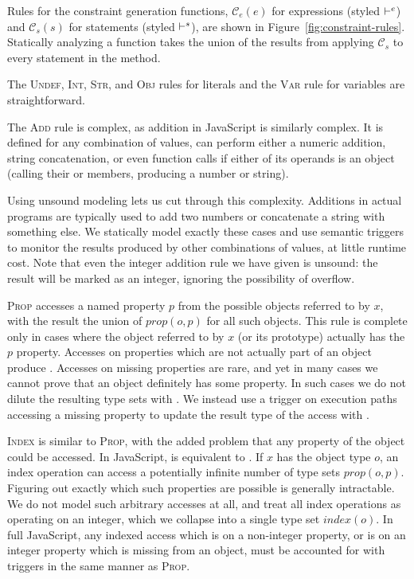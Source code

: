 Rules for the constraint generation functions, $\mathcal{C}_e(e)$ for
expressions (styled $\vdash^e$) and $\mathcal{C}_s(s)$ for statements (styled $\vdash^s$),
are shown in
Figure~\ref{fig:constraint-rules}. Statically analyzing a function takes
the union of the results from applying $\mathcal{C}_s$ to every
statement in the method.

The \textsc{Undef}, \textsc{Int}, \textsc{Str}, and \textsc{Obj}
rules for literals and the \textsc{Var} rule for variables are
straightforward.

The \textsc{Add} rule is complex, as addition in JavaScript is similarly complex. It is
defined for any combination of values, can perform either a numeric addition,
string concatenation, or even function calls if either of its operands is an
object (calling their  or  members, producing a
number or string).

Using unsound modeling lets us cut through this complexity.
Additions in actual programs are typically used to add two numbers
or concatenate a string with something else.
We statically model exactly these cases
and use semantic triggers to monitor the results produced by other
combinations of values, at little runtime cost.
Note that even the integer addition rule we have given is unsound: the
result will be marked as an integer, ignoring the possibility of
overflow.

\textsc{Prop} accesses a named property $p$ from the possible objects referred
to by $x$, with the result the union of $\mathit{prop}(o,p)$ for all such
objects.  This rule is complete only in cases where the object referred to by
$x$ (or its prototype) actually has the $p$ property. Accesses on properties
which are not actually part of an object produce .
Accesses on missing properties are rare,
and yet in many cases we cannot prove that an object
definitely has some property. In such cases we do not dilute the
resulting type sets with . We instead use a trigger
on execution paths accessing a missing property to update the result type
of the access with .

\textsc{Index} is similar to \textsc{Prop}, with the added problem that any
property of the object could be accessed.  In JavaScript,  is
equivalent to . If $x$ has the object type $o$, an index operation
can access a potentially infinite number of type sets $\mathit{prop}(o,p)$.
Figuring out exactly which such properties are possible is generally
intractable. We do not model such arbitrary accesses at all, and treat
all index operations as operating on an integer,
 which we collapse into a single type set
$\mathit{index}(o)$.  In full JavaScript, any indexed access which is on a
non-integer property, or is on an integer property which is missing from an
object, must be accounted for with triggers in the same manner as
\textsc{Prop}.

